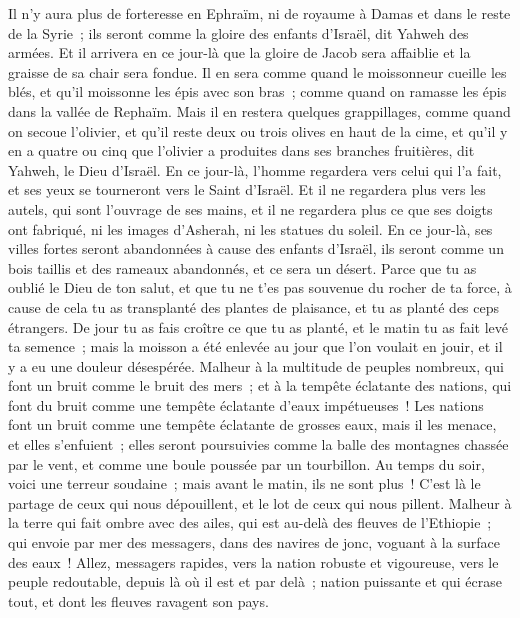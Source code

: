 \begin{multicols}{2}
Il n'y aura plus de forteresse en Ephraïm, ni de royaume à Damas et dans le reste de la Syrie~; ils seront comme la gloire des enfants d'Israël, dit Yahweh des armées.
Et il arrivera en ce jour-là que la gloire de Jacob sera affaiblie et la graisse de sa chair sera fondue.
Il en sera comme quand le moissonneur cueille les blés, et qu'il moissonne les épis avec son bras~; comme quand on ramasse les épis dans la vallée de Rephaïm.
Mais il en restera quelques grappillages, comme quand on secoue l'olivier, et qu'il reste deux ou trois olives en haut de la cime, et qu'il y en a quatre ou cinq que l'olivier a produites dans ses branches fruitières, dit Yahweh, le Dieu d'Israël.
En ce jour-là, l'homme regardera vers celui qui l'a fait, et ses yeux se tourneront vers le Saint d'Israël.
Et il ne regardera plus vers les autels, qui sont l'ouvrage de ses mains, et il ne regardera plus ce que ses doigts ont fabriqué, ni les images d'Asherah, ni les statues du soleil.
En ce jour-là, ses villes fortes seront abandonnées à cause des enfants d'Israël, ils seront comme un bois taillis et des rameaux abandonnés, et ce sera un désert.
Parce que tu as oublié le Dieu de ton salut, et que tu ne t'es pas souvenue du rocher de ta force, à cause de cela tu as transplanté des plantes de plaisance, et tu as planté des ceps étrangers.
De jour tu as fais croître ce que tu as planté, et le matin tu as fait levé ta semence~; mais la moisson a été enlevée au jour que l'on voulait en jouir, et il y a eu une douleur désespérée.
Malheur à la multitude de peuples nombreux, qui font un bruit comme le bruit des mers~; et à la tempête éclatante des nations, qui font du bruit comme une tempête éclatante d'eaux impétueuses~!
Les nations font un bruit comme une tempête éclatante de grosses eaux, mais il les menace, et elles s'enfuient~; elles seront poursuivies comme la balle des montagnes chassée par le vent, et comme une boule poussée par un tourbillon.
Au temps du soir, voici une terreur soudaine~; mais avant le matin, ils ne sont plus~! C'est là le partage de ceux qui nous dépouillent, et le lot de ceux qui nous pillent.
\VerseOne{}Malheur à la terre qui fait ombre avec des ailes, qui est au-delà des fleuves de l'Ethiopie~;
qui envoie par mer des messagers, dans des navires de jonc, voguant à la surface des eaux~! Allez, messagers rapides, vers la nation robuste et vigoureuse, vers le peuple redoutable, depuis là où il est et par delà~; nation puissante et qui écrase tout, et dont les fleuves ravagent son pays.

\end{multicols}
